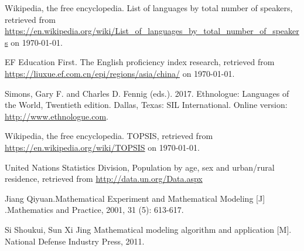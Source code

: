 \documentclass{mcmthesis}
\begin{document}
\newpage
\begin{thebibliography}{99}

Wikipedia, the free encyclopedia. List of languages by total number of speakers, retrieved from \url{https://en.wikipedia.org/wiki/List_of_languages_by_total_number_of_speakers} on \today.

EF Education First. The English proficiency index research, retrieved from \url{https://liuxue.ef.com.cn/epi/regions/asia/china/} on \today.

Simons, Gary F. and Charles D. Fennig (eds.). 2017. Ethnologue: Languages of the World, Twentieth edition. Dallas, Texas: SIL International. Online version: \url{http://www.ethnologue.com}.

Wikipedia, the free encyclopedia. TOPSIS, retrieved from \url{https://en.wikipedia.org/wiki/TOPSIS} on \today.

United Nations Statistics Division, Population by age, sex and urban/rural residence, retrieved from \url{http://data.un.org/Data.aspx}


Jiang Qiyuan.Mathematical Experiment and Mathematical Modeling [J] .Mathematics and Practice, 2001, 31 (5): 613-617.

Si Shoukui, Sun Xi Jing Mathematical modeling algorithm and application [M]. National Defense Industry Press, 2011.


\end{thebibliography}
\end{document}
